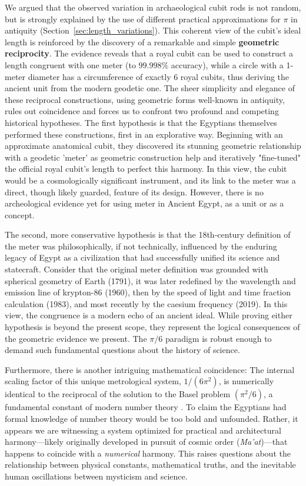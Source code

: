\documentclass[11pt]{article}
\begin{document}
We argued that the observed variation in archaeological cubit rods is not random, but is strongly explained by the use of different practical approximations for $\pi$ in antiquity (Section~\ref{sec:length_variations}). This coherent view of the cubit's ideal length is reinforced by the discovery of a remarkable and simple \textbf{geometric reciprocity}. The evidence reveals that a royal cubit can be used to construct a length congruent with one meter (to $99.998\%$ accuracy), while a circle with a 1-meter diameter has a circumference of exactly 6 royal cubits, thus deriving the ancient unit from the modern geodetic one. The sheer simplicity and elegance of these reciprocal constructions, using geometric forms well-known in antiquity, rules out coincidence and forces us to confront two profound and competing historical hypotheses.
\newpage
The first hypothesis is that the Egyptians themselves performed these constructions, first in an explorative way. Beginning with an approximate anatomical cubit, they discovered its stunning geometric relationship with a geodetic 'meter' as geometric construction help and iteratively "fine-tuned" the official royal cubit's length to perfect this harmony. In this view, the cubit would be a cosmologically significant instrument, and its link to the meter was a direct, though likely guarded, feature of its design. However, there is no archeological evidence yet for using meter in Ancient Egypt, as a unit or as a concept.

The second, more conservative hypothesis is that the 18th-century definition of the meter was philosophically, if not technically, influenced by the enduring legacy of Egypt as a civilization that had successfully unified its science and statecraft. Consider that the original meter definition was grounded with spherical geometry of Earth (1791), it was later redefined by the wavelength and emission line of krypton-86 (1960), then by the speed of light and time fraction calculation (1983), and most recently by the caesium frequency (2019). In this view, the congruence is a modern echo of an ancient ideal. While proving either hypothesis is beyond the present scope, they represent the logical consequences of the geometric evidence we present. The $\pi/6$ paradigm is robust enough to demand such fundamental questions about the history of science.

Furthermore, there is another intriguing mathematical coincidence: The internal scaling factor of this unique metrological system, $1/(6\pi^2)$, is numerically identical to the reciprocal of the solution to the Basel problem $(\pi^2/6)$, a fundamental constant of modern number theory \cite{dunham1999euler}. To claim the Egyptians had formal knowledge of number theory would be too bold and unfounded. Rather, it appears we are witnessing a system optimized for practical and architectural harmony---likely originally developed in pursuit of cosmic order (\textit{Ma'at})---that happens to coincide with a \textit{numerical} harmony. This raises questions about the relationship between physical constants, mathematical truths, and the inevitable human oscillations between mysticism and science.
\end{document}
